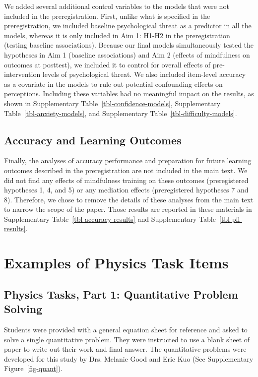 \documentclass[
  letterpaper,
  DIV=11,
  numbers=noendperiod]{scrreprt}
\begin{document}
We added several additional control variables to the models that were
not included in the preregistration. First, unlike what is specified in
the preregistration, we included baseline psychological threat as a
predictor in all the models, whereas it is only included in Aim 1: H1-H2
in the preregistration (testing baseline associations). Because our
final models simultaneously tested the hypotheses in Aim 1 (baseline
associations) and Aim 2 (effects of mindfulness on outcomes at
posttest), we included it to control for overall effects of
pre-intervention levels of psychological threat. We also included
item-level accuracy as a covariate in the models to rule out potential
confounding effects on perceptions. Including these variables had no
meaningful impact on the results, as shown in Supplementary
Table~\ref{tbl-confidence-models}, Supplementary
Table~\ref{tbl-anxiety-models}, and Supplementary
Table~\ref{tbl-difficulty-models}.

\section{Accuracy and Learning
Outcomes}\label{accuracy-and-learning-outcomes}

Finally, the analyses of accuracy performance and preparation for future
learning outcomes described in the preregistration are not included in
the main text. We did not find any effects of mindfulness training on
these outcomes (preregistered hypotheses 1, 4, and 5) or any mediation
effects (preregistered hypotheses 7 and 8). Therefore, we chose to
remove the details of these analyses from the main text to narrow the
scope of the paper. Those results are reported in these materials in
Supplementary Table~\ref{tbl-accuracy-results} and Supplementary
Table~\ref{tbl-pfl-results}.

\chapter{Examples of Physics Task
Items}\label{examples-of-physics-task-items}

\section{Physics Tasks, Part 1: Quantitative Problem
Solving}\label{physics-tasks-part-1-quantitative-problem-solving}

Students were provided with a general equation sheet for reference and
asked to solve a single quantitative problem. They were instructed to
use a blank sheet of paper to write out their work and final answer. The
quantitative problems were developed for this study by Drs. Melanie Good
and Eric Kuo (See Supplementary Figure~\ref{fig-quant}).
\end{document}
